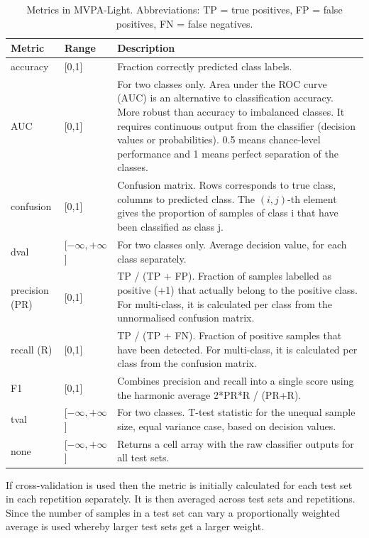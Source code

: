 \documentclass[utf8]{frontiersSCNS} %
\begin{document}
\begin{table}[]
\begin{tabularx}{\textwidth}{llX}
 Metric &  Range & Description   \\\hline
 accuracy  &  [0,1] &  Fraction correctly predicted class labels.\\
 AUC & [0,1] & For two classes only. Area under the ROC curve (AUC) is an alternative to classification accuracy. More robust than accuracy to imbalanced classes. It requires continuous output from the classifier (decision values or probabilities). 0.5 means chance-level performance and 1 means perfect separation of the classes. \\
 confusion & [0,1] &  Confusion matrix. Rows corresponds to true class, columns  to predicted class. The $(i,j)$-th element gives the proportion of samples of class i that have been classified as class j.\\
 dval & [$-\infty,+\infty$] & For two classes only. Average decision value, for each class separately.\\
 precision (PR) & [0,1] & TP / (TP + FP). Fraction of samples labelled as positive (+1) that actually belong to the positive class. For multi-class, it is calculated per class from the unnormalised confusion matrix.\\
recall (R) & [0,1] & TP / (TP + FN). Fraction of positive samples that have been detected. For multi-class, it is calculated per class from the confusion matrix.\\
F1 & [0,1] & Combines precision and recall into a single score using the harmonic average 2*PR*R / (PR+R).\\
tval & [$-\infty,+\infty$] & For two classes. T-test statistic for the unequal sample size, equal variance case, based on decision values.\\
none & [$-\infty,+\infty$] & Returns a cell array with the raw classifier outputs for all test sets.
\end{tabularx}
\caption{Metrics in MVPA-Light. Abbreviations: TP = true positives, FP = false positives, FN = false negatives.}
\label{tab:metrics}
\end{table}

If cross-validation is used then the metric is initially calculated for each test set in each repetition separately. It is then averaged across test sets and repetitions. Since the number of samples in a test set can vary a proportionally weighted average is used whereby larger test sets get a larger weight.
\end{document}
